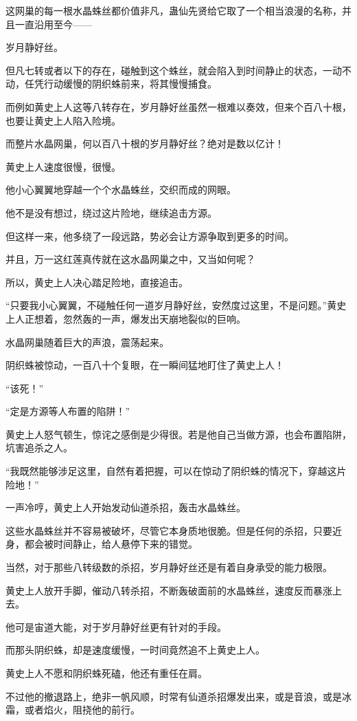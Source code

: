 \begin{this_body}
这网巢的每一根水晶蛛丝都价值非凡，蛊仙先贤给它取了一个相当浪漫的名称，并且一直沿用至今——

岁月静好丝。

但凡七转或者以下的存在，碰触到这个蛛丝，就会陷入到时间静止的状态，一动不动，任凭行动缓慢的阴织蛛前来，将其慢慢捕食。

而例如黄史上人这等八转存在，岁月静好丝虽然一根难以奏效，但来个百八十根，也要让黄史上人陷入险境。

而整片水晶网巢，何以百八十根的岁月静好丝？绝对是数以亿计！

黄史上人速度很慢，很慢。

他小心翼翼地穿越一个个水晶蛛丝，交织而成的网眼。

他不是没有想过，绕过这片险地，继续追击方源。

但这样一来，他多绕了一段远路，势必会让方源争取到更多的时间。

并且，万一这红莲真传就在这水晶网巢之中，又当如何呢？

所以，黄史上人决心踏足险地，直接追击。

“只要我小心翼翼，不碰触任何一道岁月静好丝，安然度过这里，不是问题。”黄史上人正想着，忽然轰的一声，爆发出天崩地裂似的巨响。

水晶网巢随着巨大的声浪，震荡起来。

阴织蛛被惊动，一百八十个复眼，在一瞬间猛地盯住了黄史上人！

“该死！”

“定是方源等人布置的陷阱！”

黄史上人怒气顿生，惊诧之感倒是少得很。若是他自己当做方源，也会布置陷阱，坑害追杀之人。

“我既然能够涉足这里，自然有着把握，可以在惊动了阴织蛛的情况下，穿越这片险地！”

一声冷哼，黄史上人开始发动仙道杀招，轰击水晶蛛丝。

这些水晶蛛丝并不容易被破坏，尽管它本身质地很脆。但是任何的杀招，只要近身，都会被时间静止，给人悬停下来的错觉。

当然，对于那些八转级数的杀招，岁月静好丝还是有着自身承受的能力极限。

黄史上人放开手脚，催动八转杀招，不断轰破面前的水晶蛛丝，速度反而暴涨上去。

他可是宙道大能，对于岁月静好丝更有针对的手段。

而那头阴织蛛，却是速度缓慢，一时间竟然追不上黄史上人。

黄史上人不愿和阴织蛛死磕，他还有重任在肩。

不过他的撤退路上，绝非一帆风顺，时常有仙道杀招爆发出来，或是音浪，或是冰霜，或者焰火，阻挠他的前行。


\end{this_body}
